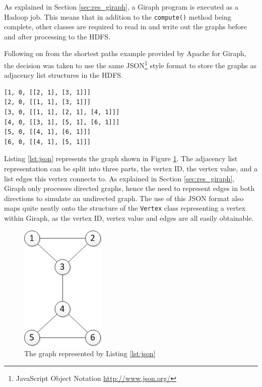 As explained in Section \ref{sec:res_giraph}, a Giraph program is executed as a Hadoop job. This means that in addition to the \verb/compute()/ method being complete, other classes are required to read in and write out the graphs before and after processing to the HDFS.

Following on from the shortest paths example \cite{giraphexample} provided by Apache for Giraph, the decision was taken to use the same JSON\footnote{JavaScript Object Notation \url{http://www.json.org/}} style format to store the graphs as adjacency list structures in the HDFS.

\begin{lstlisting}[float]
[1, 0, [[2, 1], [3, 1]]]
[2, 0, [[1, 1], [3, 1]]]
[3, 0, [[1, 1], [2, 1], [4, 1]]]
[4, 0, [[3, 1], [5, 1], [6, 1]]]
[5, 0, [[4, 1], [6, 1]]]
[6, 0, [[4, 1], [5, 1]]]
\end{lstlisting}

Listing \ref{lst:json} represents the graph shown in Figure \ref{fig:json}. The adjacency list representation can be split into three parts, the vertex ID, the vertex value, and a list edges this vertex connects to. As explained in Section \ref{sec:res_giraph}, Giraph only processes directed graphs, hence the need to represent edges in both directions to simulate an undirected graph. The use of this JSON format also maps quite neatly onto the structure of the \verb/Vertex/ class representing a vertex within Giraph, as the vertex ID, vertex value and edges are all easily obtainable.

\begin{figure}[htbp]
  \centering
    \includegraphics{./img/json}
  \caption{The graph represented by Listing \ref{lst:json}}
  \label{fig:json}
\end{figure}

